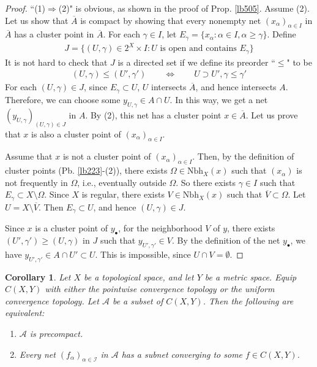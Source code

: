 \documentclass[12pt,b5paper,notitlepage]{article}
\theoremstyle{definition}
\theoremstyle{plain}
\newtheorem{co}[df]{Corollary}
\newcommand{\ovl}{\overline}
\newcommand{\scr}{\mathscr}
\newcommand{\blt}{\bullet}
\newcommand{\Nbh}{\mathrm{Nbh}}
\numberwithin{equation}{section}
\begin{document}
\begin{proof}%
``(1)$\Rightarrow$(2)" is obvious, as shown in the proof of Prop. \ref{lb505}. Assume (2). Let us show that $\ovl A$ is compact by showing that every nonempty net $(x_\alpha)_{\alpha\in I}$ in $\ovl A$ has a cluster point in $\ovl A$. 
For each $\gamma\in I$, let $E_\gamma=\{x_\alpha:\alpha\in I,\alpha\geq\gamma\}$. Define 
\begin{align*}
J=\big\{(U,\gamma)\in 2^X\times I:U\text{ is open and contains } E_\gamma \big\}
\end{align*}
It is not hard to check that $J$ is a directed set if we define its preorder ``$\leq$" to be
\begin{align*}
(U,\gamma)\leq(U',\gamma')\qquad\Longleftrightarrow\qquad U\supset U',\gamma\leq \gamma'
\end{align*}
For each $(U,\gamma)\in J$, since $E_\gamma\subset U$, $U$ intersects $\ovl A$, and hence intersects $A$. Therefore, we can choose some $y_{U,\gamma}\in A\cap U$. In this way, we get a net $(y_{U,\gamma})_{(U,\gamma)\in J}$ in $A$. By (2), this net has a cluster point $x\in\ovl A$. Let us prove that $x$ is also a cluster point of $(x_\alpha)_{\alpha\in I}$.


Assume that $x$ is not a cluster point of $(x_\alpha)_{\alpha\in I}$. Then, by the definition of cluster points (Pb. \ref{lb223}-(2)), there exists $\Omega\in\Nbh_X(x)$ such that $(x_\alpha)$ is not frequently in $\Omega$, i.e., eventually outside $\Omega$. So there exists $\gamma\in I$ such that $E_\gamma\subset X\setminus \Omega$. Since $X$ is regular, there exists $V\in\Nbh_X(x)$ such that $\ovl V\subset \Omega$. Let $U=X\setminus \ovl V$. Then $E_\gamma\subset U$, and hence $(U,\gamma)\in J$.

Since $x$ is a cluster point of $y_\blt$, for the neighborhood $V$ of $y$, there exists $(U',\gamma')\geq (U,\gamma)$ in $J$ such that $y_{U',\gamma'}\in V$. By the definition of the net $y_\blt$, we have $y_{U',\gamma'}\in A\cap U'\subset U$. This is impossible, since $U\cap V=\emptyset$.
\end{proof}


\begin{co}\label{lb508}
Let $X$ be a topological space, and let $Y$ be a metric space. Equip $C(X,Y)$ with either the pointwise convergence topology or the uniform convergence topology. Let $\scr A$ be a subset of $C(X,Y)$. Then the following are equivalent:
\begin{enumerate}[label=(\arabic*)]
\item $\scr A$ is precompact.
\item Every net $(f_\alpha)_{\alpha\in\scr I}$  in $\scr A$ has a subnet converging to some $f\in C(X,Y)$.
\end{enumerate}
\end{co}
\end{document}
